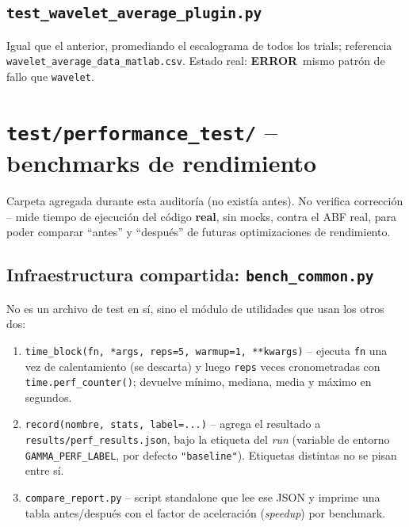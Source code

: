 \documentclass[11pt,a4paper]{article}
\newcommand{\errmark}{\textcolor{critico}{\textbf{ERROR}}}
\begin{document}
\subsection{\texttt{test\_\allowbreak wavelet\_\allowbreak average\_\allowbreak plugin.py}}
Igual que el anterior, promediando el escalograma de todos los trials; referencia
\texttt{wavelet\_\allowbreak average\_\allowbreak data\_\allowbreak matlab.csv}. Estado real: \errmark\ mismo patrón de fallo que
\texttt{wavelet}.

\newpage
\section{\texttt{test/performance\_\allowbreak test/} -- benchmarks de rendimiento}
\label{sec:performance}

Carpeta agregada durante esta auditoría (no existía antes). No verifica corrección -- mide tiempo de
ejecución del código \textbf{real}, sin mocks, contra el ABF real, para poder comparar ``antes'' y
``después'' de futuras optimizaciones de rendimiento.

\subsection{Infraestructura compartida: \texttt{bench\_\allowbreak common.py}}

No es un archivo de test en sí, sino el módulo de utilidades que usan los otros dos:

\begin{enumerate}
  \item \texttt{time\_\allowbreak block(fn, *args, reps=5, warmup=1, **kwargs)} -- ejecuta \texttt{fn} una vez de
        calentamiento (se descarta) y luego \texttt{reps} veces cronometradas con
        \texttt{time.perf\_\allowbreak counter()}; devuelve mínimo, mediana, media y máximo en segundos.
  \item \texttt{record(nombre, stats, label=...)} -- agrega el resultado a
        \texttt{results/perf\_\allowbreak results.json}, bajo la etiqueta del \textit{run} (variable de entorno
        \texttt{GAMMA\_\allowbreak PERF\_\allowbreak LABEL}, por defecto \texttt{"baseline"}). Etiquetas distintas no se pisan entre
        sí.
  \item \texttt{compare\_\allowbreak report.py} -- script standalone que lee ese JSON y imprime una tabla
        antes/después con el factor de aceleración (\textit{speedup}) por benchmark.
\end{enumerate}
\end{document}
